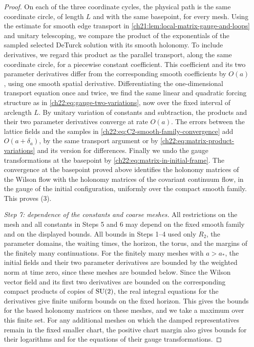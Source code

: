 \begin{proof}
On each of the three coordinate cycles, the physical path is the same coordinate circle, of length $L$ and with the same basepoint, for every mesh. Using the estimate for smooth edge transport in \cref{ch21:lem:local-matrix-gauge-and-loops} and unitary telescoping, we compare the product of the exponentials of the sampled selected DeTurck solution with its smooth holonomy. To include derivatives, we regard this product as the parallel transport, along the same coordinate circle, for a piecewise constant coefficient. This coefficient and its two parameter derivatives differ from the corresponding smooth coefficients by $O(a)$, using one smooth spatial derivative. Differentiating the one-dimensional transport equation once and twice, we find the same linear and quadratic forcing structure as in \eqref{ch22:eq:gauge-two-variations}, now over the fixed interval of arclength $L$. By unitary variation of constants and subtraction, the products and their two parameter derivatives converge at rate $O(a)$. The errors between the lattice fields and the samples in \eqref{ch22:eq:C2-smooth-family-convergence} add $O(a+\delta_a)$, by the same transport argument or by \eqref{ch22:eq:matrix-product-variations} and its version for differences. Finally we undo the gauge transformations at the basepoint by \eqref{ch22:eq:matrix-in-initial-frame}. The convergence at the basepoint proved above identifies the holonomy matrices of the Wilson flow with the holonomy matrices of the covariant continuum flow, in the gauge of the initial configuration, uniformly over the compact smooth family. This proves (3).

\emph{Step 7: dependence of the constants and coarse meshes.} All restrictions on the mesh and all constants in Steps 5 and 6 may depend on the fixed smooth family and on the displayed bounds. All bounds in Steps 1--4 used only $R_2$, the parameter domains, the waiting times, the horizon, the torus, and the margins of the finitely many continuations. For the finitely many meshes with $a>a_*$, the initial fields and their two parameter derivatives are bounded by the weighted norm at time zero, since these meshes are bounded below. Since the Wilson vector field and its first two derivatives are bounded on the corresponding compact products of copies of $\mathrm{SU}(2)$, the real integral equations for the derivatives give finite uniform bounds on the fixed horizon. This gives the bounds for the based holonomy matrices on these meshes, and we take a maximum over this finite set. For any additional meshes on which the damped representatives remain in the fixed smaller chart, the positive chart margin also gives bounds for their logarithms and for the equations of their gauge transformations.
\end{proof}

